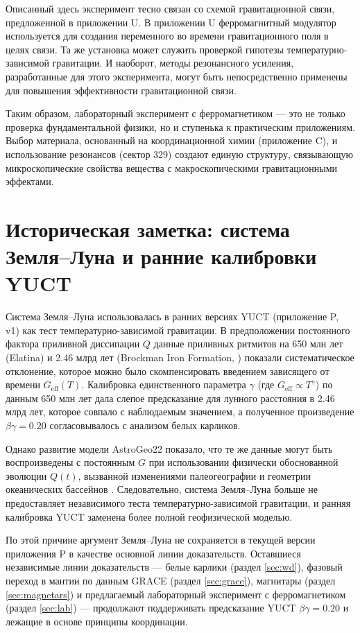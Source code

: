 \documentclass[12pt]{article}
\theoremstyle{remark}
\begin{document}
	Описанный здесь эксперимент тесно связан со схемой гравитационной связи, предложенной в приложении U. В приложении U ферромагнитный модулятор используется для создания переменного во времени гравитационного поля в целях связи. Та же установка может служить проверкой гипотезы температурно-зависимой гравитации. И наоборот, методы резонансного усиления, разработанные для этого эксперимента, могут быть непосредственно применены для повышения эффективности гравитационной связи.
	
	Таким образом, лабораторный эксперимент с ферромагнетиком — это не только проверка фундаментальной физики, но и ступенька к практическим приложениям. Выбор материала, основанный на координационной химии (приложение C), и использование резонансов (сектор 329) создают единую структуру, связывающую микроскопические свойства вещества с макроскопическими гравитационными эффектами.
	
	\section{Историческая заметка: система Земля–Луна и ранние калибровки YUCT}
	\label{sec:earth-moon}
	
	Система Земля–Луна использовалась в ранних версиях YUCT (приложение P, v1) как тест температурно-зависимой гравитации. В предположении постоянного фактора приливной диссипации \(Q\) данные приливных ритмитов на 650 млн лет (Elatina) и 2.46 млрд лет (Brockman Iron Formation, \cite{Lantink2022}) показали систематическое отклонение, которое можно было скомпенсировать введением зависящего от времени \(G_{\mathrm{eff}}(T)\). Калибровка единственного параметра \(\gamma\) (где \(G_{\mathrm{eff}}\propto T^{\gamma}\)) по данным 650 млн лет дала слепое предсказание для лунного расстояния в 2.46 млрд лет, которое совпало с наблюдаемым значением, а полученное произведение \(\beta\gamma = 0.20\) согласовывалось с анализом белых карликов.
	
	Однако развитие модели AstroGeo22 \cite{Farhat2022} показало, что те же данные могут быть воспроизведены с постоянным \(G\) при использовании физически обоснованной эволюции \(Q(t)\), вызванной изменениями палеогеографии и геометрии океанических бассейнов \cite{Zeeden2023}. Следовательно, система Земля–Луна больше не предоставляет независимого теста температурно-зависимой гравитации, и ранняя калибровка YUCT заменена более полной геофизической моделью.
	
	По этой причине аргумент Земля–Луна не сохраняется в текущей версии приложения P в качестве основной линии доказательств. Оставшиеся независимые линии доказательств — белые карлики (раздел \ref{sec:wd}), фазовый переход в мантии по данным GRACE (раздел \ref{sec:grace}), магнитары (раздел \ref{sec:magnetars}) и предлагаемый лабораторный эксперимент с ферромагнетиком (раздел \ref{sec:lab}) — продолжают поддерживать предсказание YUCT \(\beta\gamma = 0.20\) и лежащие в основе принципы координации.
	
\end{document}
